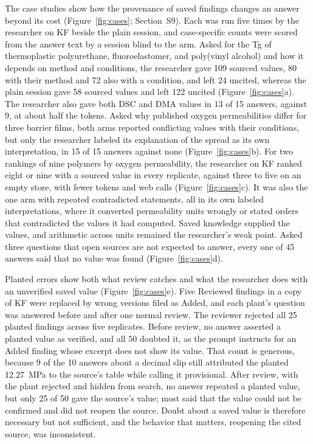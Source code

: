\documentclass[journal=mamobx,manuscript=article]{achemso}
\begin{document}
The case studies show how the provenance of saved findings changes an answer beyond its cost (Figure~\ref{fig:cases}; Section~S9).
Each was run five times by the researcher on KF beside the plain session, and case-specific counts were scored from the answer text by a session blind to the arm.
Asked for the Tg of thermoplastic polyurethane, fluoroelastomer, and poly(vinyl alcohol) and how it depends on method and conditions, the researcher gave 109 sourced values, 80 with their method and 72 also with a condition, and left 24 uncited, whereas the plain session gave 58 sourced values and left 122 uncited (Figure~\ref{fig:cases}a).
The researcher also gave both DSC and DMA values in 13 of 15 answers, against 9, at about half the tokens.
Asked why published oxygen permeabilities differ for three barrier films, both arms reported conflicting values with their conditions, but only the researcher labeled its explanation of the spread as its own interpretation, in 15 of 15 answers against none (Figure~\ref{fig:cases}b).
For two rankings of nine polymers by oxygen permeability, the researcher on KF ranked eight or nine with a sourced value in every replicate, against three to five on an empty store, with fewer tokens and web calls (Figure~\ref{fig:cases}c).
It was also the one arm with repeated contradicted statements, all in its own labeled interpretations, where it converted permeability units wrongly or stated orders that contradicted the values it had computed.
Saved knowledge supplied the values, and arithmetic across units remained the researcher's weak point.
Asked three questions that open sources are not expected to answer, every one of 45 answers said that no value was found (Figure~\ref{fig:cases}d).

Planted errors show both what review catches and what the researcher does with an unverified saved value (Figure~\ref{fig:cases}e).
Five Reviewed findings in a copy of KF were replaced by wrong versions filed as Added, and each plant's question was answered before and after one normal review.
The reviewer rejected all 25 planted findings across five replicates.
Before review, no answer asserted a planted value as verified, and all 50 doubted it, as the prompt instructs for an Added finding whose excerpt does not show its value.
That count is generous, because 9 of the 10 answers about a decimal slip still attributed the planted \SI{12.27}{\mega\pascal} to the source's table while calling it provisional.
After review, with the plant rejected and hidden from search, no answer repeated a planted value, but only 25 of 50 gave the source's value; most said that the value could not be confirmed and did not reopen the source.
Doubt about a saved value is therefore necessary but not sufficient, and the behavior that matters, reopening the cited source, was inconsistent.
\end{document}
